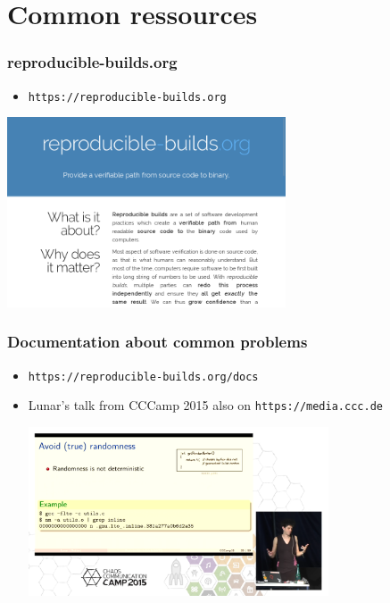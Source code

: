 \documentclass[14pt,aspectratio=169]{beamer}
\begin{document}
\section{Common ressources}

\begin{frame}
 \frametitle{reproducible-builds.org}

 \begin{itemize}
  \item \texttt{https://reproducible-builds.org}
 \end{itemize}
 \begin{center}
 \includegraphics[width=0.62\textwidth]{images/rbwww1.png}
 \end{center}
\end{frame}

\begin{frame}
 \frametitle{Documentation about common problems}
 \begin{itemize}
  \item \texttt{https://reproducible-builds.org/docs}
  \item Lunar's talk from CCCamp 2015 also on
  \texttt{https://media.ccc.de}
 \begin{center}
    \includegraphics[width=0.7\textwidth]{images/cccamp2015_lunar_random.png}
 \end{center}
 \end{itemize}
\end{frame}
\end{document}
